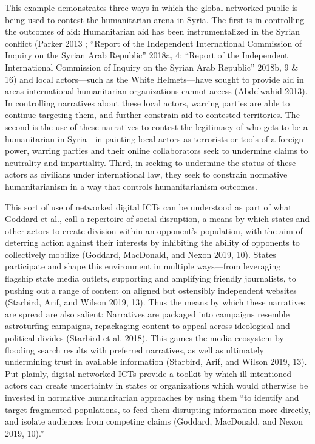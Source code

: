 \documentclass[
]{article}
\begin{document}
This example demonstrates three ways in which the global networked
public is being used to contest the humanitarian arena in Syria. The
first is in controlling the outcomes of aid: Humanitarian aid has been
instrumentalized in the Syrian conflict (Parker 2013 ; ``Report of the
Independent International Commission of Inquiry on the Syrian Arab
Republic'' 2018a, 4; ``Report of the Independent International
Commission of Inquiry on the Syrian Arab Republic'' 2018b, 9 \& 16) and
local actors---such as the White Helmets---have sought to provide aid in
areas international humanitarian organizations cannot access (Abdelwahid
2013). In controlling narratives about these local actors, warring
parties are able to continue targeting them, and further constrain aid
to contested territories. The second is the use of these narratives to
contest the legitimacy of who gets to be a humanitarian in Syria---in
painting local actors as terrorists or tools of a foreign power, warring
parties and their online collaborators seek to undermine claims to
neutrality and impartiality. Third, in seeking to undermine the status
of these actors as civilians under international law, they seek to
constrain normative humanitarianism in a way that controls
humanitarianism outcomes.

This sort of use of networked digital ICTs can be understood as part of
what Goddard et al., call a repertoire of social disruption, a means by
which states and other actors to create division within an opponent's
population, with the aim of deterring action against their interests by
inhibiting the ability of opponents to collectively mobilize (Goddard,
MacDonald, and Nexon 2019, 10). States participate and shape this
environment in multiple ways---from leveraging flagship state media
outlets, supporting and amplifying friendly journalists, to pushing out
a range of content on aligned but ostensibly independent websites
(Starbird, Arif, and Wilson 2019, 13). Thus the means by which these
narratives are spread are also salient: Narratives are packaged into
campaigns resemble astroturfing campaigns, repackaging content to appeal
across ideological and political divides (Starbird et al. 2018). This
games the media ecosystem by flooding search results with preferred
narratives, as well as ultimately undermining trust in available
information (Starbird, Arif, and Wilson 2019, 13). Put plainly, digital
networked ICTs provide a toolkit by which ill-intentioned actors can
create uncertainty in states or organizations which would otherwise be
invested in normative humanitarian approaches by using them ``to
identify and target fragmented populations, to feed them disrupting
information more directly, and isolate audiences from competing claims
(Goddard, MacDonald, and Nexon 2019, 10).''
\end{document}
